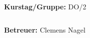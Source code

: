 \documentclass[12pt,a4paper]{article}
\begin{document}
\begin{verbatim}


\end{verbatim}
			\begin{flushleft}
			\textbf{\Large{Kurstag/Gruppe:}} \Large{DO/2}
			\end{flushleft}

\begin{verbatim}

\end{verbatim}
			\begin{flushleft}
			\LARGE{\textbf{Betreuer:}}	\Large{Clemens Nagel}	
			\end{flushleft}

\pagebreak
\setlength{\columnsep}{20pt}
\end{document}
